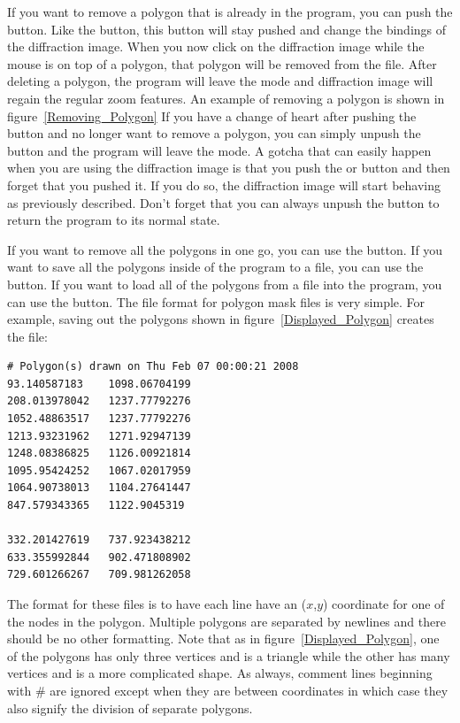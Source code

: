 If you want to remove a polygon that is already in
the program, you can push the 
button. Like the  button, this
button will stay pushed and change the bindings of 
the diffraction image. When you now click on the
diffraction image while the mouse is on top of a
polygon, that polygon will be removed from the file.
After deleting a polygon, the program will leave
the  mode and diffraction 
image will regain the regular zoom features.
An example of removing a polygon is shown
in figure~\ref{Removing_Polygon}
If you have a change of heart after pushing the
 button and no longer want to
remove a polygon, you can simply unpush the button
and the program will leave the 
mode. A gotcha that can easily happen when you are
using the diffraction image is that you push the
 or  button
and then forget that you pushed it. If you do so,
the diffraction image will start behaving as
previously described. Don't forget that you can 
always unpush the button to return the program to
its normal state.

If you want to remove all the polygons in one go,
you can use the  button. If you
want to save all the polygons inside of the 
program to a file, you can use the 
button. If you want to load all of the polygons
from a file into the program, you can use the
 button. The file format for polygon
mask files is very simple. For example, saving
out the polygons shown in figure~\ref{Displayed_Polygon}
creates the file:
\begin{lstlisting}[caption={'A demonstrative polygon mask file'}]
# Polygon(s) drawn on Thu Feb 07 00:00:21 2008
93.140587183	1098.06704199
208.013978042	1237.77792276
1052.48863517	1237.77792276
1213.93231962	1271.92947139
1248.08386825	1126.00921814
1095.95424252	1067.02017959
1064.90738013	1104.27641447
847.579343365	1122.9045319

332.201427619	737.923438212
633.355992844	902.471808902
729.601266267	709.981262058
\end{lstlisting}
The format for these files is to have each line have
an ($x$,$y$) coordinate for one of the nodes in
the polygon. Multiple polygons are separated by
newlines and there should be no other formatting.
Note that as in figure~\ref{Displayed_Polygon},
one of the polygons has only three vertices
and is a triangle while the other has many
vertices and is a more complicated shape.
As always, comment lines beginning with \# are 
ignored except when they are between coordinates
in which case they also signify the division of
separate polygons.


